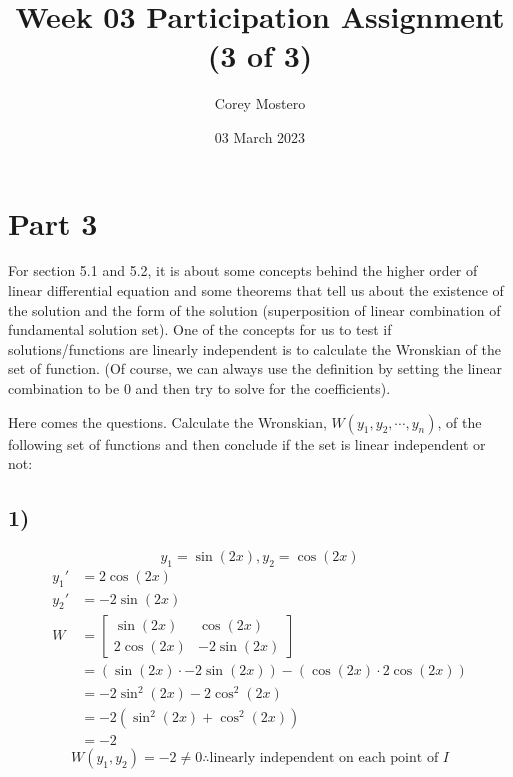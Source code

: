 \documentclass{article}
\title{Week 03 Participation Assignment (3 of 3)}
\date{03 March 2023}
\author{Corey Mostero}
\begin{document}
\newcommand{\hr}{\par\noindent\rule{\textwidth}{0.4pt}}

\maketitle
\newpage

\tableofcontents

\section{Part 3}
For section 5.1 and 5.2, it is about some concepts behind the higher order of linear differential equation and some theorems that tell us about the existence of the solution and the form of the solution (superposition of linear combination of fundamental solution set). One of the concepts for us to test if solutions/functions are linearly independent is to calculate the Wronskian of the set of function. (Of course, we can always use the definition by setting the linear combination to be 0 and then try to solve for the coefficients).

Here comes the questions. Calculate the Wronskian, $ W(y_1,y_2,\cdots,y_n) $, of the following set of functions and then conclude if the set is linear independent or not:

\subsection{1)}
$$ y_1 = \sin(2x), y_2 = \cos(2x) $$
\begin{align*}
	y_1' & = 2\cos(2x) \\
	y_2' & = -2\sin(2x) \\
	W & = \begin{bmatrix}
		\sin(2x) & \cos(2x) \\
		2\cos(2x) & -2\sin(2x)
	\end{bmatrix} \\
	  & = \left( \sin(2x) \cdot -2\sin(2x) \right) - \left( \cos(2x) \cdot 2\cos(2x) \right) \\
	  & = -2\sin^2(2x) - 2\cos^2(2x) \\
	  & = -2 \left( \sin^2(2x) + \cos^2(2x) \right) \\
	  & = -2
\end{align*}
\begin{equation*}
	\boxed{
		W(y_1,y_2) = -2 \neq 0 \therefore \text{linearly independent on each point of } I
	}
\end{equation*}
\end{document}
